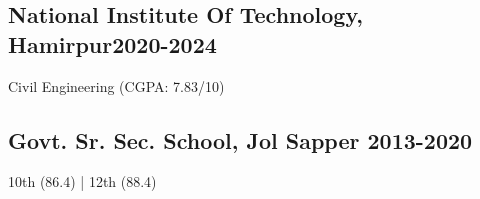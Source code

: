 \vspace*{10pt}
\subsection {{National Institute Of Technology, Hamirpur}\hfill 2020-2024}
\vspace*{3pt}
Civil Engineering (CGPA: 7.83/10)

\vspace*{6pt}
\subsection{{Govt. Sr. Sec. School, Jol Sapper }\hfill 2013-2020}
\vspace*{3pt}
10th (86.4) | 12th (88.4)
